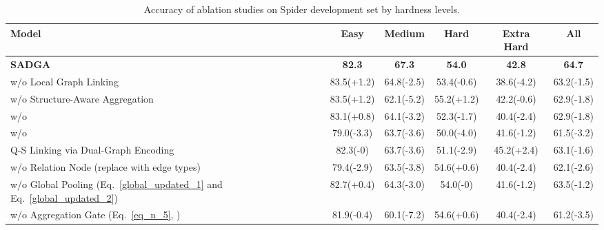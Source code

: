 \documentclass{article}
\begin{document}
\begin{table*}[hbt]
    \setlength\tabcolsep{2pt}
    \caption{Accuracy of ablation studies on Spider development set by hardness levels.}
    \label{app_ablation_studies_result} 
    \renewcommand\arraystretch{1.1}
    \centering
    \footnotesize
    \begin{tabular}{lccccc}
        \toprule
        \textbf{Model}                                                                      & \textbf{Easy}         & \textbf{Medium}       & \textbf{Hard}        & \textbf{Extra Hard}   & \textbf{All}\\ 
        \hline\hline
        \textbf{SADGA}                                                                      & \textbf{82.3}         & \textbf{67.3}         & \textbf{54.0}        & \textbf{42.8}          &\textbf{64.7}\\
        \quad w/o Local Graph Linking                                                       & 83.5(+1.2)            & 64.8(-2.5)            & 53.4(-0.6)           & 38.6(-4.2)             & 63.2(-1.5)\\
        \quad w/o Structure-Aware Aggregation                                               & 83.5(+1.2)            & 62.1(-5.2)            & 55.2(+1.2)           & 42.2(-0.6)             & 62.9(-1.8)\\
        \quad w/o                        & 83.1(+0.8)            & 64.1(-3.2)            & 52.3(-1.7)           & 40.4(-2.4)             & 62.9(-1.8)\\
        \quad w/o                        & 79.0(-3.3)            & 63.7(-3.6)            & 50.0(-4.0)           & 41.6(-1.2)             & 61.5(-3.2)\\
        \quad Q-S Linking via Dual-Graph Encoding                                           & 82.3(-0)              & 63.7(-3.6)            & 51.1(-2.9)           & 45.2(+2.4)             & 63.1(-1.6)\\
        \quad w/o Relation Node (replace with edge types)                                   & 79.4(-2.9)            & 63.5(-3.8)            & 54.6(+0.6)           & 40.4(-2.4)             & 62.1(-2.6)\\
        \quad w/o Global Pooling (Eq.~\ref{global_updated_1} and Eq.~\ref{global_updated_2})& 82.7(+0.4)            & 64.3(-3.0)            & 54.0(-0)             & 41.6(-1.2)             & 63.5(-1.2)\\
        \quad w/o Aggregation Gate (Eq.~\ref{eq_n_5}, )             & 81.9(-0.4)            & 60.1(-7.2)            & 54.6(+0.6)           & 40.4(-2.4)             & 61.2(-3.5)\\

\end{tabular}
\end{table*}
\end{document}
